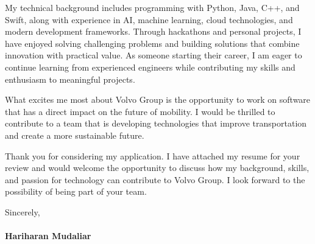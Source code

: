 \documentclass[letterpaper,11pt]{article}
\begin{document}
My technical background includes programming with Python, Java, C++, and Swift, along with experience in AI, machine learning, cloud technologies, and modern development frameworks. Through hackathons and personal projects, I have enjoyed solving challenging problems and building solutions that combine innovation with practical value. As someone starting their career, I am eager to continue learning from experienced engineers while contributing my skills and enthusiasm to meaningful projects.

What excites me most about Volvo Group is the opportunity to work on software that has a direct impact on the future of mobility. I would be thrilled to contribute to a team that is developing technologies that improve transportation and create a more sustainable future.

Thank you for considering my application. I have attached my resume for your review and would welcome the opportunity to discuss how my background, skills, and passion for technology can contribute to Volvo Group. I look forward to the possibility of being part of your team.

\vspace{15pt}

\noindent
Sincerely, \\
\vspace{10pt} \\
\textbf{Hariharan Mudaliar}
\end{document}
